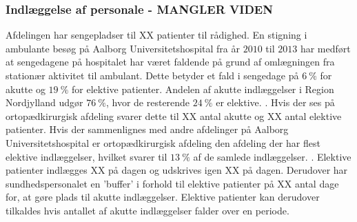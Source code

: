 \subsubsection{Indlæggelse af personale - MANGLER VIDEN}
Afdelingen har sengepladser til XX patienter til rådighed. En stigning i ambulante besøg på Aalborg Universitetshospital fra år $2010$ til $2013$ har medført at sengedagene på hospitalet har været faldende på grund af omlægningen fra stationær aktivitet til ambulant. Dette betyder et fald i sengedage på $6~\%$ for akutte og $19~\%$ for elektive patienter. Andelen af akutte indlæggelser i Region Nordjylland udgør $76~\%$, hvor de resterende $24~\%$ er elektive. \cite{RegionNord2016}. Hvis der ses på ortopædkirurgisk afdeling svarer dette til XX antal akutte og XX antal elektive patienter. Hvis der sammenlignes med andre afdelinger på Aalborg Universitetshospital er ortopædkirurgisk afdeling den afdeling der har flest elektive indlæggelser, hvilket svarer til $13~\%$ af de samlede indlæggelser. \cite{RegionNord2016}. Elektive patienter indlægges XX på dagen og udskrives igen XX på dagen. Derudover har sundhedspersonalet en 'buffer' i forhold til elektive patienter på XX antal dage for, at gøre plads til akutte indlæggelser. Elektive patienter kan derudover tilkaldes hvis antallet af akutte indlæggelser falder over en periode. 

